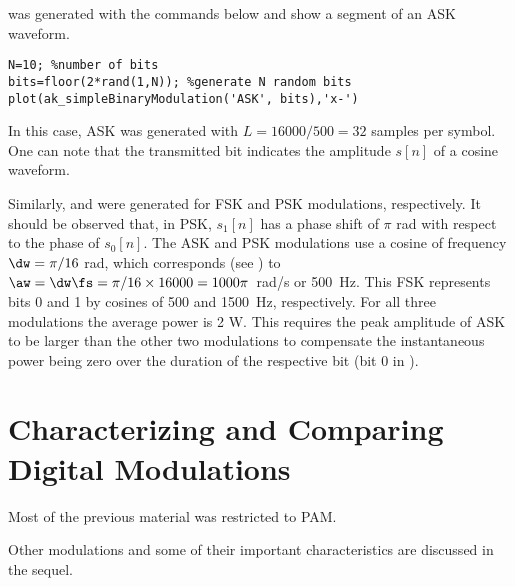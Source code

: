  was generated with the commands below and show a segment of an ASK waveform.
\begin{lstlisting}
N=10; %number of bits 
bits=floor(2*rand(1,N)); %generate N random bits
plot(ak_simpleBinaryModulation('ASK', bits),'x-')
\end{lstlisting}
In this case, ASK was generated with $L=16000/500=32$ samples per symbol. One can note that the transmitted bit indicates the amplitude $s[n]$ of a cosine waveform. 

Similarly,  and  were generated for FSK and PSK modulations, respectively. It should be observed that, in PSK, $s_1[n]$ has a phase shift of $\pi$ rad with respect to the phase of $s_0[n]$. The ASK and PSK modulations use a cosine of frequency $\dw = \pi/16$ rad, which corresponds (see ) to $\aw = \dw \fs = \pi/16 \times 16000 = 1000 \pi$~rad/s or 500~Hz. This FSK represents bits 0 and 1 by cosines of 500 and 1500~Hz, respectively. For all three modulations the average power is 2 W. This requires the peak amplitude of ASK to be larger than the other two modulations to compensate the instantaneous power being
zero over the duration of the respective bit (bit 0 in ).

\section{Characterizing and Comparing Digital Modulations}


Most of the previous material was restricted to PAM. 
Other modulations and some of their important characteristics are discussed in the sequel.

